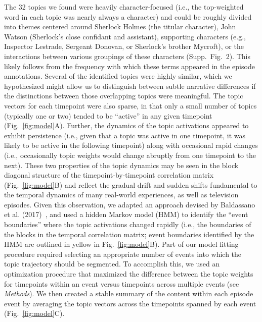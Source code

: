 \documentclass[10pt]{article}
\newcommand{\topics}{2}
\begin{document}
The 32 topics we found were heavily character-focused (i.e., the top-weighted word in each topic was nearly always a character) and could be roughly divided into themes centered around Sherlock Holmes (the titular character), John Watson (Sherlock's close confidant and assistant), supporting characters (e.g., Inspector Lestrade, Sergeant Donovan, or Sherlock's brother Mycroft), or the interactions between various groupings of these characters (Supp.\ Fig.~\topics).  This likely follows from the frequency with which these terms appeared in the episode annotations.  Several of the identified topics were highly similar, which we hypothesized might allow us to distinguish between subtle narrative differences if the distinctions between those overlapping topics were meaningful.  The topic vectors for each timepoint were also sparse, in that only a small number of topics (typically one or two) tended to be ``active'' in any given timepoint (Fig.~\ref{fig:model}A).  Further, the dynamics of the topic activations appeared to exhibit persistence (i.e., given that a topic was active in one timepoint, it was likely to be active in the following timepoint) along with occasional rapid changes (i.e., occasionally topic weights would change abruptly from one timepoint to the next).  These two properties of the topic dynamics may be seen in the block diagonal structure of the timepoint-by-timepoint correlation matrix (Fig.~\ref{fig:model}B) and reflect the gradual drift and sudden shifts fundamental to the temporal dynamics of many real-world experiences, as well as television episodes.  Given this observation, we adapted an approach devised by Baldassano et al. (2017)~\cite{BaldEtal17}, and used a hidden Markov model (HMM) to identify the ``event boundaries'' where the topic activations changed rapidly (i.e., the boundaries of the blocks in the temporal correlation matrix; event boundaries identified by the HMM are outlined in yellow in Fig.~\ref{fig:model}B).  Part of our model fitting procedure required selecting an appropriate number of events into which the topic trajectory should be segmented.  To accomplish this, we used an optimization procedure that maximized the difference between the topic weights for timepoints within an event versus timepoints across multiple events (see \textit{Methods}).  We then created a stable summary of the content within each episode event by averaging the topic vectors across the timepoints spanned by each event (Fig.~\ref{fig:model}C).
\end{document}

